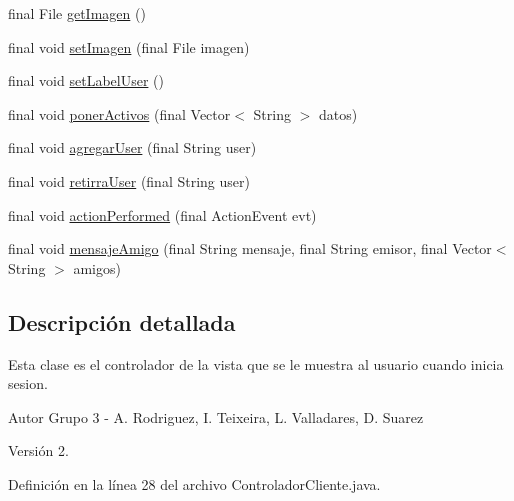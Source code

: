 \begin{DoxyCompactItemize}
\item 
final File \hyperlink{classcom_1_1ucab_1_1javachat_1_1_cliente_1_1controller_1_1_controlador_cliente_adb75ed57c31baca876b69990bbafb400}{get\-Imagen} ()
\item 
final void \hyperlink{classcom_1_1ucab_1_1javachat_1_1_cliente_1_1controller_1_1_controlador_cliente_a6e7b9e6c4a82829efbd0aae6c2658184}{set\-Imagen} (final File imagen)
\item 
final void \hyperlink{classcom_1_1ucab_1_1javachat_1_1_cliente_1_1controller_1_1_controlador_cliente_aa19a69efd4f74891f467345498ddcb39}{set\-Label\-User} ()
\item 
final void \hyperlink{classcom_1_1ucab_1_1javachat_1_1_cliente_1_1controller_1_1_controlador_cliente_a0ec86bb408cc78782346b4c01b95a7d6}{poner\-Activos} (final Vector$<$ String $>$ datos)
\item 
final void \hyperlink{classcom_1_1ucab_1_1javachat_1_1_cliente_1_1controller_1_1_controlador_cliente_a3aff80775389cf97755cd5c7db915603}{agregar\-User} (final String user)
\item 
final void \hyperlink{classcom_1_1ucab_1_1javachat_1_1_cliente_1_1controller_1_1_controlador_cliente_abb244f9e8904743e123c5e86a42c4710}{retirra\-User} (final String user)
\item 
final void \hyperlink{classcom_1_1ucab_1_1javachat_1_1_cliente_1_1controller_1_1_controlador_cliente_a132f8481c0894cdad40225f8541931a0}{action\-Performed} (final Action\-Event evt)
\item 
final void \hyperlink{classcom_1_1ucab_1_1javachat_1_1_cliente_1_1controller_1_1_controlador_cliente_aad384e7a7cfd86adf60b62591a5d49ff}{mensaje\-Amigo} (final String mensaje, final String emisor, final Vector$<$ String $>$ amigos)
\end{DoxyCompactItemize}


\subsection{Descripción detallada}
Esta clase es el controlador de la vista que se le muestra al usuario cuando inicia sesion.

\begin{DoxyAuthor}{Autor}
Grupo 3 -\/ A. Rodriguez, I. Teixeira, L. Valladares, D. Suarez 
\end{DoxyAuthor}
\begin{DoxyVersion}{Versión}
2. 
\end{DoxyVersion}


Definición en la línea 28 del archivo Controlador\-Cliente.\-java.



